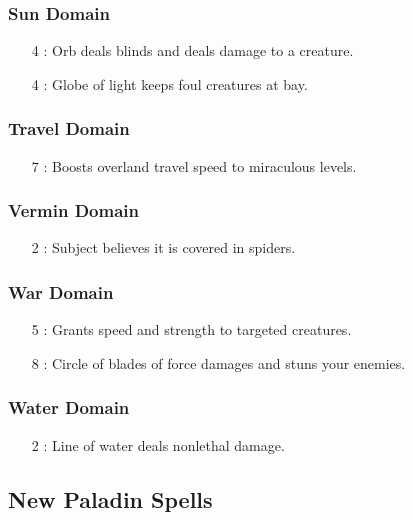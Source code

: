 \subsubsection{Sun Domain}
\begin{itemize}
 \item[4] : Orb deals blinds and deals damage to a creature.
 \item[4] : Globe of light keeps foul creatures at bay.
\end{itemize}
\subsubsection{Travel Domain}
\begin{itemize}
 \item[7] : Boosts overland travel speed to miraculous levels.
\end{itemize}
\subsubsection{Vermin Domain}
\begin{itemize}
 \item[2] : Subject believes it is covered in spiders.
\end{itemize}
\subsubsection{War Domain}
\begin{itemize}
 \item[5] : Grants speed and strength to targeted creatures.
 \item[8] : Circle of blades of force damages and stuns your enemies.
\end{itemize}
\subsubsection{Water Domain}
\begin{itemize}
 \item[2] : Line of water deals nonlethal damage.
\end{itemize}


\subsection{New Paladin Spells}
